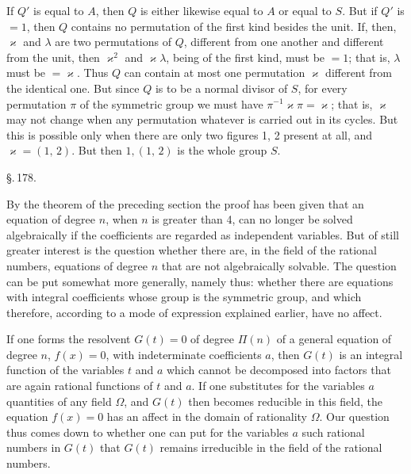 
If $Q'$ is equal to $A$, then $Q$ is either likewise equal to $A$ or equal to $S$. But if $Q'$ is $=1$, then $Q$ contains no permutation of the first kind besides the unit. If, then, $\varkappa$ and $\lambda$ are two permutations of $Q$, different from one another and different from the unit, then $\varkappa^2$ and $\varkappa\lambda$, being of the first kind, must be $=1$; that is, $\lambda$ must be $=\varkappa$. Thus $Q$ can contain at most one permutation $\varkappa$ different from the identical one. But since $Q$ is to be a normal divisor of $S$, for every permutation $\pi$ of the symmetric group we must have $\pi^{-1}\varkappa\pi = \varkappa$; that is, $\varkappa$ may not change when any permutation whatever is carried out in its cycles. But this is possible only when there are only two figures 1, 2 present at all, and $\varkappa = (1,\,2)$. But then $1, (1,\,2)$ is the whole group $S$.

\begin{center}
\S.\,178.

\end{center}

By the theorem of the preceding section the proof has been given that an equation of degree $n$, when $n$ is greater than 4, can no longer be solved algebraically if the coefficients are regarded as independent variables. But of still greater interest is the question whether there are, in the field of the rational numbers, equations of degree $n$ that are not algebraically solvable. The question can be put somewhat more generally, namely thus: whether there are equations with integral coefficients whose group is the symmetric group, and which therefore, according to a mode of expression explained earlier, have no affect.

If one forms the  resolvent $G(t)=0$ of degree $\Pi(n)$ of a general equation of degree $n$, $f(x)=0$, with indeterminate coefficients $a$, then $G(t)$ is an integral function of the variables $t$ and $a$ which cannot be decomposed into factors that are again rational functions of $t$ and $a$. If one substitutes for the variables $a$ quantities of any field $\Omega$, and $G(t)$ then becomes reducible in this field, the equation $f(x)=0$ has an affect in the domain of rationality $\Omega$. Our question thus comes down to whether one can put for the variables $a$ such rational numbers in $G(t)$ that $G(t)$ remains irreducible in the field of the rational numbers.

